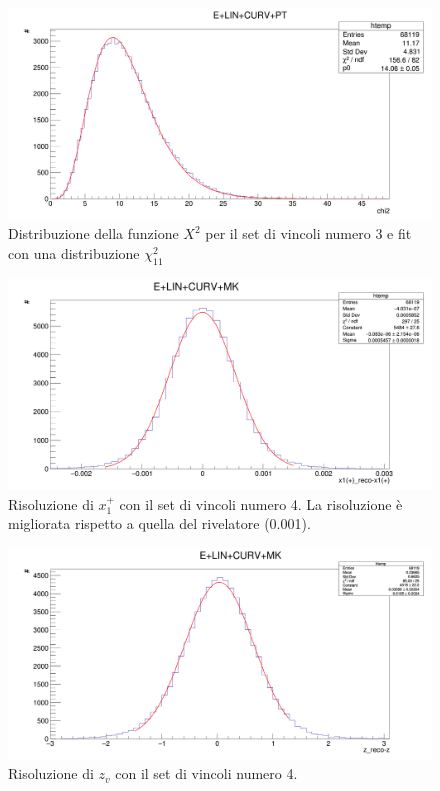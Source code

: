 \documentclass[8pt]{extarticle}
\begin{document}
\begin{figure}
	\begin{center}
		\includegraphics[scale=0.25]{set_3_chi2} 
		\caption{Distribuzione della funzione $X^2$ per il set di vincoli numero 3 e fit con una distribuzione $\chi^2_{11}$}
		\label{fig:set_3_chi2}
	\end{center}
\end{figure}

\begin{figure}
	\begin{center}
		\includegraphics[scale=0.25]{set_4_x} 
		\caption{Risoluzione di $x_1^+$ con il set di vincoli numero 4. La risoluzione è migliorata rispetto a quella del rivelatore (0.001).}
		\label{fig:set_4_x}
	\end{center}
\end{figure}

\begin{figure}
	\begin{center}
		\includegraphics[scale=0.25]{set_4_z} 
		\caption{Risoluzione di $z_v$ con il set di vincoli numero 4.}
		\label{fig:set_4_z}
	\end{center}
\end{figure}
\end{document}
